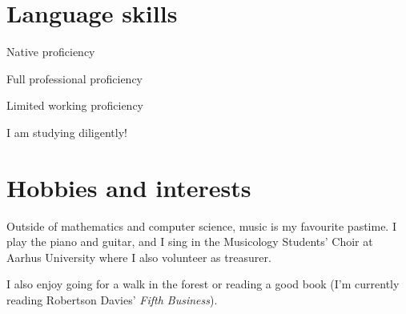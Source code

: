 \documentclass[article, a4paper, 11pt, oneside]{memoir}
\begin{document}
\section{Language skills}

\begin{description}[itemsep=0pt]
    \item[Danish] Native proficiency
    \item[English] Full professional proficiency
    \item[German] Limited working proficiency
    \item[Korean] I am studying diligently!
\end{description}


\section{Hobbies and interests}

Outside of mathematics and computer science, music is my favourite pastime. I play the piano and guitar, and I sing in the Musicology Students' Choir at Aarhus University where I also volunteer as treasurer.

I also enjoy going for a walk in the forest or reading a good book (I'm currently reading Robertson Davies' \emph{Fifth Business}).
\end{document}
